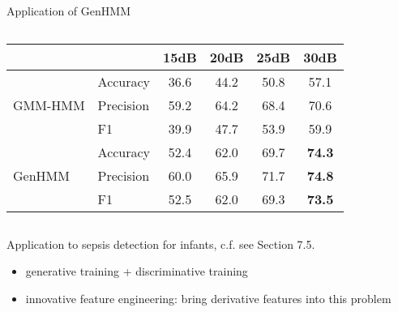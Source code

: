 \begin{frame}{Application of GenHMM}
\begin{columns}
\begin{table}
\begin{adjustbox}{width=0.90\textwidth}
\begin{tabular}{llcccc}
                                 && {15dB} &  {20dB} &  {25dB} & {30dB}  \\
          \midrule
          \multirow{3}{*}{GMM-HMM}
                                 & Accuracy & 36.6 &  44.2 &  50.8 & 57.1
          \\
                                 &Precision & 59.2 &  64.2 &  68.4 & 70.6  \\
                                 & F1       & 39.9 &  47.7 &  53.9 & 59.9 \\
          \midrule
          \multirow{3}{*}{GenHMM}
                                 & Accuracy & 52.4 & 62.0 &  69.7 & \textbf{74.3} \\
                                 &Precision & 60.0 &  65.9 &  71.7 & \textbf{74.8}  \\
                                 & F1       & 52.5 &  62.0 &  69.3 & \textbf{73.5} \\
          \bottomrule                                                                  
        \end{tabular}
      \end{adjustbox}
      \vspace{0.1cm}
    \end{table}
  \end{columns}
  
  \flushleft
  \vskip -0.5cm
  Application to sepsis detection for infants, c.f. see Section 7.5.
  \begin{itemize}[label=\textbullet]
  \item generative training + discriminative training
  \item innovative feature engineering: bring derivative features into this problem
  \end{itemize}
  

\end{frame}


